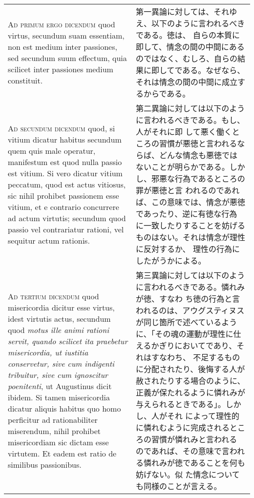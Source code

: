 \documentclass[10pt]{jsarticle}
\begin{document}
\begin{longtable}{p{21em}p{21em}}
 
\\



{\scshape Ad primum ergo dicendum} quod virtus, secundum suam
essentiam, non est medium inter passiones, sed secundum suum effectum,
quia scilicet inter passiones medium constituit.

&

 第一異論に対しては、それゆえ、以下のように言われるべきである。徳は、
 自らの本質に即して、情念の間の中間にあるのではなく、むしろ、自らの結
 果に即してである。なぜなら、それは情念の間の中間に成立するからである。
 
\\



{\scshape Ad secundum dicendum} quod, si vitium dicatur habitus
secundum quem quis male operatur, manifestum est quod nulla passio est
vitium. Si vero dicatur vitium peccatum, quod est actus vitiosus, sic
nihil prohibet passionem esse vitium, et e contrario concurrere ad
actum virtutis; secundum quod passio vel contrariatur rationi, vel
sequitur actum rationis.

&

 第二異論に対しては以下のように言われるべきである。もし、人がそれに即
 して悪く働くところの習慣が悪徳と言われるならば、どんな情念も悪徳では
 ないことが明らかである。しかし、邪悪な行為であるところの罪が悪徳と言
 われるのであれば、この意味では、情念が悪徳であったり、逆に有徳な行為
 に一致したりすることを妨げるものはない。それは情念が理性に反対するか、
 理性の行為にしたがうかによる。

 
\\

{\scshape Ad tertium dicendum} quod misericordia dicitur esse virtus,
idest virtutis actus, secundum quod {\itshape motus ille animi rationi
servit, quando scilicet ita praebetur misericordia, ut iustitia
conservetur, sive cum indigenti tribuitur, sive cum ignoscitur
poenitenti}, ut Augustinus dicit ibidem. Si tamen misericordia dicatur
aliquis habitus quo homo perficitur ad rationabiliter miserendum,
nihil prohibet misericordiam sic dictam esse virtutem. Et eadem est
ratio de similibus passionibus.

&

 第三異論に対しては以下のように言われるべきである。憐れみが徳、すなわ
 ち徳の行為と言われるのは、アウグスティヌスが同じ箇所で述べているよう
 に、「その魂の運動が理性に仕えるかぎりにおいてであり、それはすなわち、
 不足するものに分配されたり、後悔する人が赦されたりする場合のように、
 正義が保たれるように憐れみが与えられるときである」。しかし、人がそれ
 によって理性的に憐れむように完成されるところの習慣が憐れみと言われる
 のであれば、その意味で言われる憐れみが徳であることを何も妨げない。似
 た情念についても同様のことが言える。
 
\\

\end{longtable}
\newpage
\end{document}
